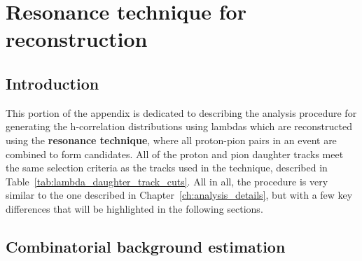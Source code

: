 \chapter{Resonance technique for \lmb reconstruction}
\label{ap:resonance}

\section{Introduction}
This portion of the appendix is dedicated to describing the analysis procedure for generating the h-\lmb correlation distributions using lambdas which are reconstructed using the \textbf{resonance technique}, where all proton-pion pairs in an event are combined to form \lmb candidates. All of the proton and pion daughter tracks meet the same selection criteria as the tracks used in the \vz technique, described in Table~\ref{tab:lambda_daughter_track_cuts}. All in all, the procedure is very similar to the one described in Chapter~\ref{ch:analysis_details}, but with a few key differences that will be highlighted in the following sections. 

\section{Combinatorial background estimation}
\label{sec:comb_background_res}

